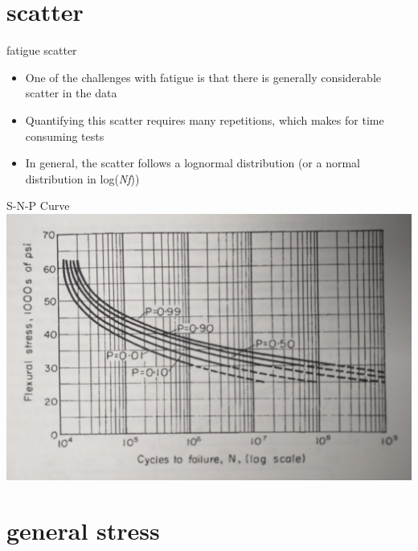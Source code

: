 \documentclass[
  letterpaper,
  ignorenonframetext,
  aspectratio=43,
  handout,
  12pt]{beamer}
\providecommand{\tightlist}{%
  \setlength{\itemsep}{0pt}\setlength{\parskip}{0pt}}
\providecommand{\tightlist}{%
\setlength{\itemsep}{0pt}\setlength{\parskip}{0pt}}
\let\Oldincludegraphics\includegraphics
\renewcommand{\includegraphics}[2][]{\Oldincludegraphics[width=\textwidth,height=0.7\textheight,keepaspectratio]{#2}}
\begin{document}
\hypertarget{scatter}{%
\section{scatter}\label{scatter}}

\begin{frame}{fatigue scatter}
\protect\hypertarget{fatigue-scatter}{}
\begin{itemize}
\tightlist
\item
  One of the challenges with fatigue is that there is generally
  considerable scatter in the data
\item
  Quantifying this scatter requires many repetitions, which makes for
  time consuming tests
\item
  In general, the scatter follows a lognormal distribution (or a normal
  distribution in log(\emph{N}\emph{f}))
\end{itemize}
\end{frame}

\begin{frame}{S-N-P Curve}
\protect\hypertarget{s-n-p-curve}{}
\includegraphics{../images/S-N-P.jpg}
\end{frame}

\hypertarget{general-stress}{%
\section{general stress}\label{general-stress}}
\end{document}
